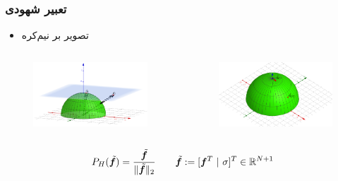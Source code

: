 \begin{frame}
\frametitle{تعبیر شهودی}
\begin{itemize}
\item{تصویر بر نیم‌کره}
\end{itemize}
\begin{columns}
\begin{figure}
	\centering
	\includegraphics[scale=0.15]{Images/HP1.png}
\end{figure}
\begin{figure}
	\centering
	\includegraphics[scale=0.15]{Images/HP2.png}
\end{figure}
\end{columns}

\begin{align}
P_{H}(\tilde{\bm{f}}) = \dfrac{\tilde{\bm{f}}}{\|\tilde{\bm{f}}\|_{2}}\quad \quad \tilde{\bm{f}}:= [\bm{f}^{T}~|~\sigma]^{T}\in \mathbb{R}^{N+1}
\end{align}

\end{frame}


